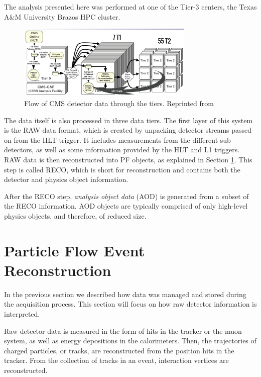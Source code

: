 The analysis presented here was performed at one of the Tier-3 centers, the Texas A$\&$M University Brazos HPC cluster\cite{brazosc}. 

 \begin{figure}[H]
 	\centering
 	\includegraphics[width=0.75\textwidth]{figures/dataflowtiers_MC.png}
 	\singlespace
 	\caption{Flow of CMS detector data through the tiers. Reprinted from \cite{CMSdatatier}}
 	\label{fig:datatier}
 \end{figure}

 The data itself is also processed in three data tiers. The first layer of this system is the RAW data format, which is created by unpacking detector streams passed on from the HLT trigger. It includes measurements from the different sub-detectors, as well as some information provided by the HLT and L1 triggers. RAW data is then reconstructed into PF objects, as explained in Section \ref{sec:track}. This step is called RECO, which is short for reconstruction and contains both the detector and physics object information. 

 After the RECO step, \textit{analysis object data} (AOD) is generated from a subset of the RECO information. AOD objects are typically comprised of only high-level physics objects, and therefore, of reduced size. 

\section{Particle Flow Event Reconstruction}
\label{sec:track}

 In the previous section we described how data was managed and stored during the acquisition process. This section will focus on how raw detector information is interpreted.  

Raw detector data is measured in the form of hits in the tracker or the muon system, as well as energy depositions in the calorimeters. Then, the trajectories of charged particles, or tracks, are reconstructed from the position hits in the tracker. From the collection of tracks in an event, interaction vertices are reconstructed. 

